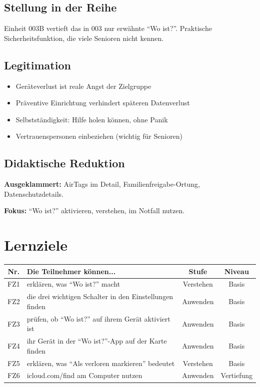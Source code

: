 \documentclass[11pt,a4paper]{article}
\begin{document}
\subsection{Stellung in der Reihe}
Einheit 003B vertieft das in 003 nur erwähnte ``Wo ist?''. Praktische Sicherheitsfunktion, die viele Senioren nicht kennen.

\subsection{Legitimation}
\begin{itemize}
    \item Geräteverlust ist reale Angst der Zielgruppe
    \item Präventive Einrichtung verhindert späteren Datenverlust
    \item Selbstständigkeit: Hilfe holen können, ohne Panik
    \item Vertrauenspersonen einbeziehen (wichtig für Senioren)
\end{itemize}

\subsection{Didaktische Reduktion}
\textbf{Ausgeklammert:} AirTags im Detail, Familienfreigabe-Ortung, Datenschutzdetails.

\textbf{Fokus:} ``Wo ist?'' aktivieren, verstehen, im Notfall nutzen.

\section{Lernziele}

\begin{tabular}{|c|p{7cm}|c|c|}
\hline
\textbf{Nr.} & \textbf{Die Teilnehmer können...} & \textbf{Stufe} & \textbf{Niveau} \\
\hline
FZ1 & erklären, was ``Wo ist?'' macht & Verstehen & Basis \\
FZ2 & die drei wichtigen Schalter in den Einstellungen finden & Anwenden & Basis \\
FZ3 & prüfen, ob ``Wo ist?'' auf ihrem Gerät aktiviert ist & Anwenden & Basis \\
FZ4 & ihr Gerät in der ``Wo ist?''-App auf der Karte finden & Anwenden & Basis \\
FZ5 & erklären, was ``Als verloren markieren'' bedeutet & Verstehen & Basis \\
FZ6 & icloud.com/find am Computer nutzen & Anwenden & Vertiefung \\
\hline
\end{tabular}
\end{document}
